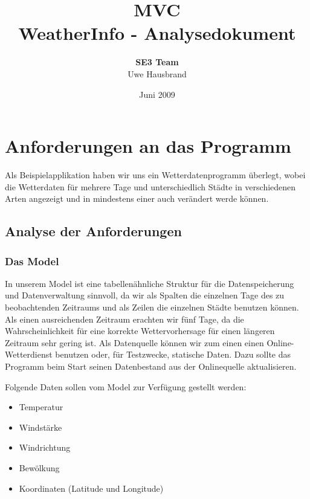 \documentclass[11pt,a4paper]{scrreprt}
\begin{document}
\selectlanguage{\german}
\title{{\Huge \bf MVC}\\[0.55em]{\LARGE WeatherInfo - Analysedokument}}
\author{{\bf SE3 Team}\\Uwe Hausbrand}
\date{Juni 2009}

\maketitle

\tableofcontents

\chapter{Anforderungen an das Programm}

Als Beispielapplikation haben wir uns ein Wetterdatenprogramm \"uberlegt, wobei die
Wetterdaten f\"ur mehrere Tage und unterschiedlich St\"adte in verschiedenen Arten
angezeigt und in mindestens einer auch ver\"andert werde k\"onnen.

\section{Analyse der Anforderungen}

\subsection{Das Model}
In unserem Model ist eine tabellen\"ahnliche Struktur f\"ur die Datenspeicherung und
Datenverwaltung sinnvoll, da wir als Spalten die einzelnen Tage des zu beobachtenden
Zeitraums und als Zeilen die einzelnen St\"adte benutzen k\"onnen. Als einen ausreichenden
Zeitraum erachten wir f\"unf Tage, da die Wahrscheinlichkeit f\"ur eine
korrekte Wettervorhersage f\"ur einen l\"angeren Zeitraum sehr gering ist.
Als Datenquelle k\"onnen wir zum einen einen Online-Wetterdienst benutzen oder, f\"ur Testzwecke,
statische Daten. Dazu sollte das Programm beim Start seinen Datenbestand aus der Onlinequelle
aktualisieren.

Folgende Daten sollen vom Model zur Verf\"ugung gestellt werden:
\begin{itemize}
  \item Temperatur
  \item Windst\"arke
  \item Windrichtung
  \item Bew\"olkung
  \item Koordinaten (Latitude und Longitude)
\end{itemize}
\end{document}
